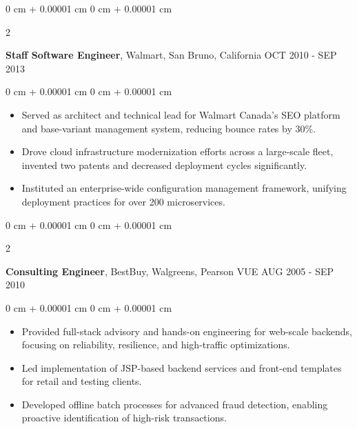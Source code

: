 \documentclass[10pt, letterpaper]{article}
\newenvironment{highlights}{
    \begin{itemize}[
        topsep=0.10 cm,
        parsep=0.10 cm,
        partopsep=0pt,
        itemsep=0pt,
        leftmargin=0 cm + 10pt
    ]
}{
    \end{itemize}
} %
\newenvironment{onecolentry}{
    \begin{adjustwidth}{
        0 cm + 0.00001 cm
    }{
        0 cm + 0.00001 cm
    }
}{
    \end{adjustwidth}
} %
\newenvironment{twocolentry}[2][]{
    \onecolentry
    \def\secondColumn{#2}
    \setcolumnwidth{\fill, 4.5 cm}
    \begin{paracol}{2}
}{
    \switchcolumn \raggedleft \secondColumn
    \end{paracol}
    \endonecolentry
} %
\begin{document}
        \vspace{0.20 cm}
        \begin{twocolentry}{
            OCT 2010 - SEP 2013
        }
            \textbf{Staff Software Engineer}, Walmart, San Bruno, California\end{twocolentry}
        \vspace{0.10 cm}
        \begin{onecolentry}
            \begin{highlights}
                \item Served as architect and technical lead for Walmart Canada's SEO platform and base-variant management system, reducing bounce rates by 30\%.
                \item Drove cloud infrastructure modernization efforts across a large-scale fleet, invented two patents and decreased deployment cycles significantly.
                \item Instituted an enterprise-wide configuration management framework, unifying deployment practices for over 200 microservices.
            \end{highlights}
        \end{onecolentry}

        \vspace{0.20 cm}
        \begin{twocolentry}{
            AUG 2005 - SEP 2010
        }
            \textbf{Consulting Engineer}, BestBuy, Walgreens, Pearson VUE\end{twocolentry}
        \vspace{0.10 cm}
        \begin{onecolentry}
            \begin{highlights}
                \item Provided full-stack advisory and hands-on engineering for web-scale backends, focusing on reliability, resilience, and high-traffic optimizations.
                \item Led implementation of JSP-based backend services and front-end templates for retail and testing clients.
                \item Developed offline batch processes for advanced fraud detection, enabling proactive identification of high-risk transactions.
            \end{highlights}
        \end{onecolentry}
\end{document}
